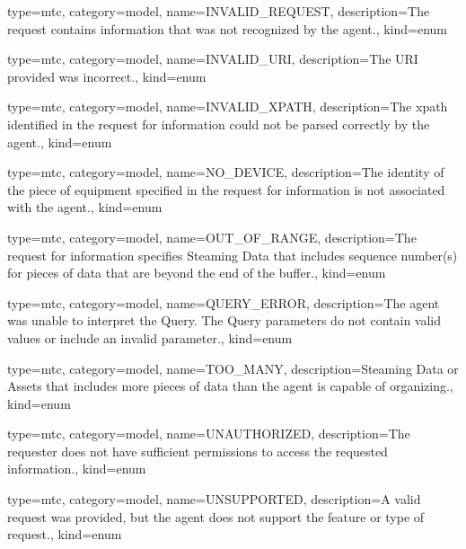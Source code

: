 {
  type=mtc,
  category=model,
  name={INVALID\_REQUEST},
  description={The \gls{request} contains information that was not recognized by the \gls{agent}.},
  kind={enum}
}


{
  type=mtc,
  category=model,
  name={INVALID\_URI},
  description={The URI provided was incorrect.},
  kind={enum}
}

{
  type=mtc,
  category=model,
  name={INVALID\_XPATH},
  description={The \gls{xpath} identified in the \gls{request} for information could not be parsed correctly by the \gls{agent}.},
  kind={enum}
}

{
  type=mtc,
  category=model,
  name={NO\_DEVICE},
  description={The identity of the piece of equipment specified in the \gls{request} for information is not associated with the \gls{agent}.},
  kind={enum}
}

{
  type=mtc,
  category=model,
  name={OUT\_OF\_RANGE},
  description={The \gls{request} for information specifies Steaming Data that includes sequence number(s) for pieces of data that are beyond the end of the buffer.},
  kind={enum}
}


{
  type=mtc,
  category=model,
  name={QUERY\_ERROR},
  description={The \gls{agent} was unable to interpret the Query.  The Query parameters do not contain valid values or include an invalid parameter.},
  kind={enum}
}

{
  type=mtc,
  category=model,
  name={TOO\_MANY},
  description={Steaming Data or Assets that includes more pieces of data than the \gls{agent} is capable of organizing.},
  kind={enum}
}

{
  type=mtc,
  category=model,
  name={UNAUTHORIZED},
  description={The \gls{requester} does not have sufficient permissions to access the requested information.},
  kind={enum}
}

{
  type=mtc,
  category=model,
  name={UNSUPPORTED},
  description={A valid \gls{request} was provided, but the \gls{agent} does not support the feature or type of \gls{request}.},
  kind={enum}
}













